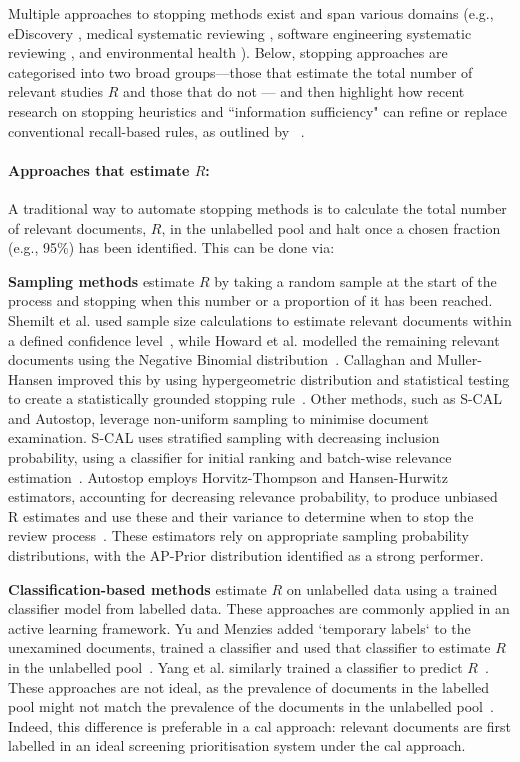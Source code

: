 \documentclass[10pt,oneside]{book}
\begin{document}
Multiple approaches to stopping methods exist and span various domains (e.g., eDiscovery \cite{yang_heuristic_2021, yang_minimizing_2021}, medical systematic reviewing \cite{shemilt_pinpointing_2014}, software engineering systematic reviewing \cite{yu_fast2_2019}, and environmental health \cite{howard_swift-active_2020}). Below, stopping approaches are categorised into two broad groups—those that estimate the total number of relevant studies $R$ and those that do not — and then highlight how recent research on stopping heuristics and ``information sufficiency" can refine or replace conventional recall-based rules, as outlined by ~\cite{stevenson_stopping_2023}.

\paragraph{Approaches that estimate $R$:}
A traditional way to automate stopping methods is to calculate the total number of relevant documents, $R$, in the unlabelled pool and halt once a chosen fraction (e.g., 95\%) has been identified. This can be done via:

\textbf{Sampling methods} estimate $R$ by taking a random sample at the start of the process and stopping when this number or a proportion of it has been reached. Shemilt et al. used sample size calculations to estimate relevant documents within a defined confidence level~\cite{shemilt_pinpointing_2014}, while Howard et al. modelled the remaining relevant documents using the Negative Binomial distribution~\cite{howard_swift-active_2020}. Callaghan and Muller-Hansen improved this by using hypergeometric distribution and statistical testing to create a statistically grounded stopping rule~\cite{callaghan_statistical_2020}. Other methods, such as S-CAL and Autostop, leverage non-uniform sampling to minimise document examination. S-CAL uses stratified sampling with decreasing inclusion probability, using a classifier for initial ranking and batch-wise relevance estimation~\cite{cormack_scalability_2016}. Autostop employs Horvitz-Thompson and Hansen-Hurwitz estimators, accounting for decreasing relevance probability, to produce unbiased R estimates and use these and their variance to determine when to stop the review process~\cite{li_when_2020}. These estimators rely on appropriate sampling probability distributions, with the AP-Prior distribution identified as a strong performer.

\textbf{Classification-based methods} estimate $R$ on unlabelled data using a trained classifier model from labelled data. These approaches are commonly applied in an active learning framework. Yu and Menzies added `temporary labels` to the unexamined documents, trained a classifier and used that classifier to estimate $R$ in the unlabelled pool~\cite{yu_fast2_2019}. Yang et al. similarly trained a classifier to predict $R$~\cite{yang_heuristic_2021}. These approaches are not ideal, as the prevalence of documents in the labelled pool might not match the prevalence of the documents in the unlabelled pool~\cite{del_coz_learning_2021}. Indeed, this difference is preferable in a \gls*{cal} approach: relevant documents are first labelled in an ideal screening prioritisation system under the \gls*{cal} approach. 
\end{document}
